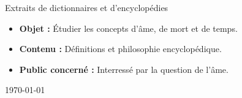 \begin{titlepage}
\begin{minipage}{0.4\textwidth}
\begin{flushleft} \large
\end{flushleft}
\end{minipage}
\begin{minipage}{0.4\textwidth}
\begin{flushright} \large
Extraits de dictionnaires et d'encyclopédies
\end{flushright}
\end{minipage}

\vfill
{\sf \footnotesize
\begin{itemize}[leftmargin=1cm, label=, itemsep=1pt]
\item {\bf Objet : } Étudier les concepts d'âme, de mort et de temps.
\item {\bf Contenu : } Définitions et philosophie encyclopédique.
\item {\bf Public concerné : } Interressé par la question de l'âme.
\end{itemize}
}

\vfill
{\large \today}

\end{titlepage}
